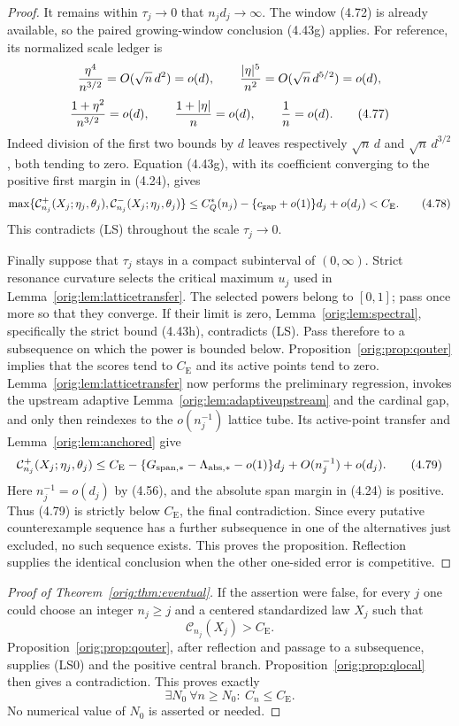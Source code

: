 \documentclass[11pt,a4paper]{article}
\numberwithin{equation}{section}
\theoremstyle{definition}
\theoremstyle{remark}
\newcommand{\CE}{C_{\mathrm E}}
\begin{document}
\begin{proof}
It remains within $\tau_j\to0$ that $n_jd_j\to\infty$.  The window
(4.72) is already available, so the paired growing-window conclusion
(4.43g) applies.  For reference, its normalized scale ledger is
\[
 {\eta^4\over n^{3/2}}=O(\sqrt n\,d^2)=o(d),\qquad
 {|\eta|^5\over n^2}=O(\sqrt n\,d^{5/2})=o(d),
\]
\[
 {1+\eta^2\over n^{3/2}}=o(d),\qquad
 {1+|\eta|\over n}=o(d),\qquad {1\over n}=o(d).      \tag{4.77}
\]
Indeed division of the first two bounds by $d$ leaves respectively
$\sqrt n\,d$ and $\sqrt n\,d^{3/2}$, both tending to zero.  Equation
(4.43g), with its coefficient converging to the positive first margin in
(4.24), gives
\[
 \max\{\mathcal C_{n_j}^+(X_j;\eta_j,\theta_j),
          \mathcal C_{n_j}^-(X_j;\eta_j,\theta_j)\}
 \le C_Q^*(n_j)-\{c_{\rm gap}+o(1)\}d_j+o(d_j)<\CE.   \tag{4.78}
\]
This contradicts (LS) throughout the scale $\tau_j\to0$.

Finally suppose that $\tau_j$ stays in a compact subinterval of
$(0,\infty)$.  Strict resonance curvature selects the critical maximum
$u_j$ used in Lemma~\ref{orig:lem:latticetransfer}.  The selected powers belong
to $[0,1]$; pass once more so that they converge.  If their limit is zero,
Lemma~\ref{orig:lem:spectral}, specifically the strict bound (4.43h),
contradicts (LS).  Pass therefore to a subsequence on which the power is
bounded below.  Proposition~\ref{orig:prop:qouter} implies that the scores tend
to $\CE$ and its active points tend to zero.  Lemma~\ref{orig:lem:latticetransfer}
now performs the preliminary regression, invokes the upstream adaptive
Lemma~\ref{orig:lem:adaptiveupstream} and the cardinal gap, and only then
reindexes to the $o(n_j^{-1})$ lattice tube.  Its active-point transfer and
Lemma~\ref{orig:lem:anchored} give
\[
 \mathcal C_{n_j}^+(X_j;\eta_j,\theta_j)
 \le\CE-\{G_{\rm span,*}-\Lambda_{\rm abs,*}-o(1)\}d_j
       +O(n_j^{-1})+o(d_j).                            \tag{4.79}
\]
Here $n_j^{-1}=o(d_j)$ by (4.56), and the absolute span margin in (4.24) is
positive.  Thus (4.79) is strictly below $\CE$, the final contradiction.
Since every putative counterexample sequence has a further subsequence in
one of the alternatives just excluded, no such sequence exists.  This
proves the proposition.  Reflection supplies the identical conclusion when
the other one-sided error is competitive.
\end{proof}

\begin{proof}[Proof of Theorem~\ref{orig:thm:eventual}]
If the assertion were false, for every $j$ one could choose an integer
$n_j\ge j$ and a centered standardized law $X_j$ such that
\[
                         \mathcal C_{n_j}(X_j)>\CE.
\]
Proposition~\ref{orig:prop:qouter}, after reflection and passage to a
subsequence, supplies (LS0) and the positive central branch.
Proposition~\ref{orig:prop:qlocal} then gives a contradiction.  This proves
exactly
\[
 \boxed{\qquad \exists N_0\ \forall n\ge N_0:\ C_n\le\CE.\qquad}
\]
No numerical value of $N_0$ is asserted or needed.
\end{proof}
\end{document}
